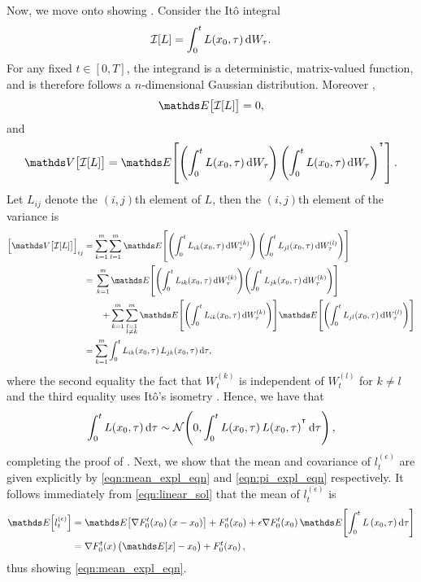 Now, we move onto showing .
Consider the It\^o integral
\[
	\mathcal{I}[L] = \int_0^t{L\!\left(x_0, \tau\right)\dif W_\tau}.
\]
For any fixed \(t \in [0,T]\), the integrand is a deterministic, matrix-valued function, and is therefore follows a \(n\)-dimensional Gaussian distribution.
Moreover \cite{KallianpurSundar_2014_StochasticAnalysisDiffusion},
\[
	\avg{\mathcal{I}[L]} = 0,
\]
and
\[
	\var{\mathcal{I}[L]} = \avg{\left(\int_0^t{L\!\left(x_0, \tau\right)\dif W_\tau}\right)\left(\int_0^t{L\!\left(x_0, \tau\right)\dif W_\tau}\right)^{\T}}.
\]
Let \(L_{ij}\) denote the \((i,j)\)th element of \(L\), then the \((i,j)\)th element of the variance is
\begin{align*}
	\left[\var{\mathcal{I}[L]}\right]_{ij} %
	 & = \sum_{k=1}^{m}\sum_{l=1}^m\avg{\left(\int_0^t{L_{ik}\!\left(x_0, \tau\right)\dif W_{\tau}^{(k)}}\right)\left(\int_0^t{L_{jl}\!\left(x_0, \tau\right)\dif W_{\tau}^{(l)}}\right)} \\
	 & = \begin{multlined}[t]
		     \sum_{k=1}^{m}\avg{\left(\int_0^t{L_{ik}\!\left(x_0, \tau\right)\dif W_{\tau}^{(k)}}\right)\!\left(\int_0^t{L_{jk}\!\left(x_0, \tau\right)\dif W_{\tau}^{(k)}}\right)} \\
		     \!\!+ \sum_{k=1}^{m}\sum_{\substack{l=1 \\ l \neq k}}^m\avg{\left(\int_0^t{L_{ik}\!\left(x_0, \tau\right)\dif W_{\tau}^{(k)}}\right)}\!\avg{\left(\int_0^t{L_{jl}\!\left(x_0, \tau\right)\dif W_{\tau}^{(l)}}\right)}
	     \end{multlined}                                                                  \\
	 & = \sum_{k=1}^m{\int_0^t{L_{ik}\!\left(x_0, \tau\right)L_{jk}\!\left(x_0, \tau\right)\dif\tau}},
\end{align*}
where the second equality  the fact that \(W_t^{(k)}\) is independent of \(W_t^{(l)}\) for \(k \neq l\) and the third equality uses It\^o's isometry \cite{KallianpurSundar_2014_StochasticAnalysisDiffusion}.
Hence, we have that
\[
	\int_0^t{L\!\left(x_0, \tau\right)\dif\tau} \isGauss{0, \int_0^t{L\!\left(x_0, \tau\right)L\!\left(x_0, \tau\right)^{\T}}\dif\tau},
\]
completing the proof of .
Next, we show that the mean and covariance of \(l_t^{(\epsilon)}\) are given explicitly by \cref{eqn:mean_expl_eqn} and \cref{eqn:pi_expl_eqn} respectively.
It follows immediately from \cref{eqn:linear_sol} that the mean of \(l_t^{(\epsilon)}\) is
\begin{align*}
	\avg{l_t^{(\epsilon)}} & = \avg{\nabla F_0^t\!\left(x_0\right) \left(x - x_0\right)} + F_0^t\!\left(x_0\right) + \epsilon \nabla F_0^t\!\left(x_0\right)\avg{\int_0^t{L\left(x_0,\tau\right)\dif\tau}} \\
	                       & = \nabla F_0^t(x) \left(\avg{x} - x_0\right) + F_0^t\!\left(x_0\right),
\end{align*}
thus showing \cref{eqn:mean_expl_eqn}.


